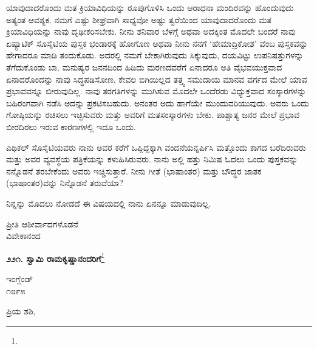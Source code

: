\vspace{0.1cm}

ಯಾವುದಾದರೊಂದು ಮತ ಕ್ರಿಯಾವಿಧಿಯನ್ನು ರೂಪುಗೊಳಿಸಿ ಒಂದು ಆರಾಧನಾ ಮಂದಿರವನ್ನು ಹೊಂದುವುದು ಅತ್ಯಂತ ಆವಶ್ಯಕ. ನಮಗೆ ಎಷ್ಟು ಶೀಘ್ರವಾಗಿ ಸಾಧ್ಯವೋ ಅಷ್ಟು ತ್ವರೆಯಿಂದ ಯಾವುದಾದರೊಂದು ಮತ ಕ್ರಿಯಾವಿಧಿಯನ್ನು ನಾವು ದೃಢೀಕರಿಸಬೇಕು. ನೀನು ಶನಿವಾರ ಬೆಳಗ್ಗೆ ಅಥವಾ ಅದಕ್ಕಿಂತ ಮೊದಲೇ ಬಂದರೆ ನಾವು ಏಷ್ಯಾಟಿಕ್ ಸೊಸೈಟಿಯ ಪುಸ್ತಕ ಭಂಡಾರಕ್ಕೆ ಹೋಗೊಣ ಅಥವಾ ನೀನು ನನಗೆ `ಹೇಮಾದ್ರಿಕೋಶ' ವೆಂಬ ಪುಸ್ತಕವನ್ನು ಹೇಗಾದರೂ ಮಾಡಿ ತಂದುಕೊಡು. ಅದರಲ್ಲಿ ನಮಗೆ ಬೇಕಾಗಿರುವುದು ಸಿಕ್ಕುವುದು, ದಯವಿಟ್ಟು ಉಪನಿಷತ್ತುಗಳನ್ನು ತೆಗೆದುಕೊಂಡು ಬಾ. ಮನುಷ್ಯರ ಜನನದಿಂದ ಹಿಡಿದು ಮರಣದವರೆಗೆ ಏನಾದರೂ ಅತಿ ವೈಭವಯುಕ್ತವಾದ ಏನಾದರೊಂದನ್ನು ನಾವು ಸಿದ್ಧಪಡಿಸೋಣ. ಕೇವಲ ಬಿಗಿಯಿಲ್ಲದ ತತ್ತ್ವ ಸಮುದಾಯ ಮಾನವ ವರ್ಗದ ಮೇಲೆ ಯಾವ ಪ್ರಭಾವವನ್ನೂ ಬೀರುವುದಿಲ್ಲ. ನಾವು ತರಗತಿಗಳನ್ನು ಮುಗಿಸುವ ಮೊದಲೇ ಒಂದೆರಡು ವಿಧ್ಯುಕ್ತವಾದ ಸಂಸ್ಕಾರಗಳನ್ನು ಬಹಿರಂಗವಾಗಿ ನಡೆಸಿ ಅದನ್ನು ಪ್ರಕಟಿಸಬಹುದು. ಅನಂತರ ಅದು ಹಾಗೆಯೇ ಮುಂದುವರಿಯುವುದು. ಅವರು ಒಂದು ಗೋಷ್ಠಿಯನ್ನು ರಚಿಸಲು ಇಚ್ಛಿಸುವರು ಮತ್ತು ಅವರಿಗೆ ಮತಸಂಸ್ಕಾರಗಳು ಬೇಕು. ಪಾಶ್ಚಾತ್ಯ ಜನರ ಮೇಲೆ ಪ್ರಭಾವ ಬೀರದಿರಲು ಇರುವ ಕಾರಣಗಳಲ್ಲಿ ಇದೂ ಒಂದು.

\vspace{0.1cm}

ಎಥಿಕಲ್ ಸೊಸೈಟಿಯವರು ನಾನು ಅವರ ಕರೆಗೆ ಒಪ್ಪಿದ್ದಕ್ಕಾಗಿ ವಂದನೆಯನ್ನರ್ಪಿಸಿ ಮತ್ತೊಂದು ಕಾಗದ ಬರೆದಿರುವರು ಮತ್ತು ಅವರ ವ್ಯವಸ್ಥೆಯ ಪತ್ರಿಕೆಯನ್ನು ಕಳುಹಿಸಿರುವರು. ನಾನು ಅಲ್ಲಿ ಹತ್ತು ನಿಮಿಷ ಓದಲು ಒಂದು ಪುಸ್ತಕವನ್ನು ನನ್ನೊಡನೆ ತರಬೇಕೆಂದು ಅವರು ಇಚ್ಚಿಸುತ್ತಾರೆ. ನೀನು ಗೀತೆ (ಭಾಷಾಂತರ) ಮತ್ತು ಬೌದ್ಧರ ಜಾತಕ (ಭಾಷಾಂತರ)ವನ್ನು ನಿನ್ನೊಡನೆ ತರುವೆಯಾ?

\vspace{0.1cm}

ನಿನ್ನನ್ನು ಮೊದಲು ನೋಡದೆ ಈ ವಿಷಯದಲ್ಲಿ ನಾನು ಏನನ್ನೂ ಮಾಡುವುದಿಲ್ಲ.

{\flushright
ಪ್ರೀತಿ ಆಶೀರ್ವಾದಗಳೊಡನೆ\\ವಿವೇಕಾನಂದ\par}

\begin{center}
\textbf{೨೨೧. ಸ್ವಾಮಿ ರಾಮಕೃಷ್ಣಾನಂದರಿಗೆ}\footnote{}
\end{center}

\begin{flushright}
ಇಂಗ್ಲೆಂಡ್\\೧೮೯೫
\end{flushright}

\noindent
ಪ್ರಿಯ ಶಶಿ,

